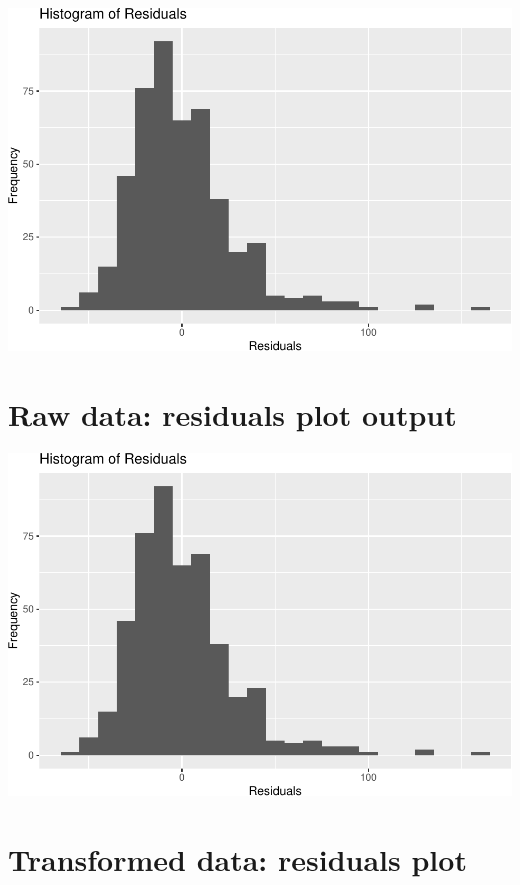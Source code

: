 \documentclass[
]{article}
\begin{document}
\includegraphics{L7_Correlation_and_regression_pdf_files/figure-latex/unnamed-chunk-10-1.pdf}

\hypertarget{raw-data-residuals-plot-output}{%
\section{Raw data: residuals plot
output}\label{raw-data-residuals-plot-output}}

\includegraphics{L7_Correlation_and_regression_pdf_files/figure-latex/unnamed-chunk-11-1.pdf}

\hypertarget{transformed-data-residuals-plot}{%
\section{Transformed data: residuals
plot}\label{transformed-data-residuals-plot}}
\end{document}

